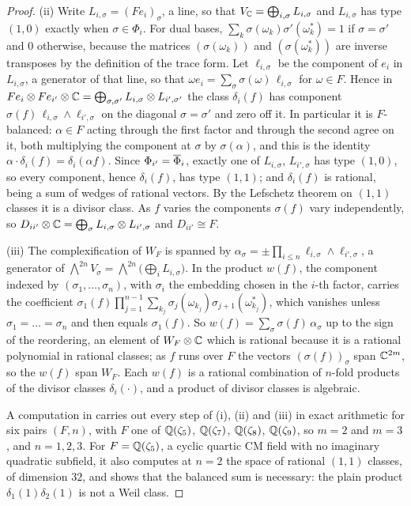 \begin{proof}
(ii) Write $L_{i,\sigma}=(Fe_{i})_{\sigma}$, a line, so that
$V_{\mathbb{C}}=\bigoplus_{i,\sigma}L_{i,\sigma}$ and $L_{i,\sigma}$ has type $(1,0)$
exactly when $\sigma\in\Phi_{i}$. For dual bases,
$\sum_{k}\sigma(\omega_{k})\sigma'(\omega_{k}^{*})=1$ if $\sigma=\sigma'$ and
$0$ otherwise, because the matrices $(\sigma(\omega_{k}))$ and
$(\sigma(\omega_{k}^{*}))$ are inverse transposes by the definition of the
trace form. Let $\ell_{i,\sigma}$ be the component of $e_{i}$ in
$L_{i,\sigma}$, a generator of that line, so that
$\omega e_{i}=\sum_{\sigma}\sigma(\omega)\,\ell_{i,\sigma}$ for $\omega\in F$.
Hence in $Fe_{i}\otimes Fe_{i'}\otimes\mathbb{C}
=\bigoplus_{\sigma,\sigma'}L_{i,\sigma}\otimes L_{i',\sigma'}$ the class
$\delta_{i}(f)$ has component $\sigma(f)\,\ell_{i,\sigma}\wedge\ell_{i',\sigma}$
on the diagonal $\sigma=\sigma'$ and zero off it. In particular it is
$F$-balanced: $\alpha\in F$ acting through the first factor and through the
second agree on it, both multiplying the component at $\sigma$ by
$\sigma(\alpha)$, and this is the identity
$\alpha\cdot\delta_{i}(f)=\delta_{i}(\alpha f)$. Since $\Phi_{i'}=\overline{\Phi}_{i}$,
exactly one of $L_{i,\sigma}$, $L_{i',\sigma}$ has type $(1,0)$, so every
component, hence $\delta_{i}(f)$, has type $(1,1)$; and $\delta_{i}(f)$ is
rational, being a sum of wedges of rational vectors. By the Lefschetz theorem
on $(1,1)$ classes it is a divisor class. As $f$ varies the components
$\sigma(f)$ vary independently, so $D_{ii'}\otimes\mathbb{C}=\bigoplus_{\sigma}
L_{i,\sigma}\otimes L_{i',\sigma}$ and $D_{ii'}\cong F$.

(iii) The complexification of $W_{F}$ is spanned by
$\alpha_{\sigma}=\pm\prod_{i\le n}\ell_{i,\sigma}\wedge\ell_{i',\sigma}$, a
generator of $\bigwedge^{2n}V_{\sigma}=\bigwedge^{2n}\bigl(\bigoplus_{i}L_{i,\sigma}\bigr)$.
In the product $w(f)$, the component indexed by $(\sigma_{1},\dots,\sigma_{n})$,
with $\sigma_{i}$ the embedding chosen in the $i$-th factor, carries the
coefficient
$\sigma_{1}(f)\prod_{j=1}^{n-1}\sum_{k_{j}}\sigma_{j}(\omega_{k_{j}})\sigma_{j+1}(\omega_{k_{j}}^{*})$,
which vanishes unless $\sigma_{1}=\dots=\sigma_{n}$ and then equals
$\sigma_{1}(f)$. So $w(f)=\sum_{\sigma}\sigma(f)\,\alpha_{\sigma}$ up to the
sign of the reordering, an element of $W_{F}\otimes\mathbb{C}$ which is rational
because it is a rational polynomial in rational classes; as $f$ runs over
$F$ the vectors $(\sigma(f))_{\sigma}$ span $\mathbb{C}^{2m}$, so the $w(f)$ span
$W_{F}$. Each $w(f)$ is a rational combination of $n$-fold products of the
divisor classes $\delta_{i}(\cdot)$, and a product of divisor classes is
algebraic.

A computation in \cite{BMB26} carries out every
step of (i), (ii) and (iii) in exact arithmetic for six pairs $(F,n)$, with
$F$ one of $\mathbb{Q}(\zeta_{5})$, $\mathbb{Q}(\zeta_{7})$, $\mathbb{Q}(\zeta_{8})$,
$\mathbb{Q}(\zeta_{9})$, so $m=2$ and $m=3$, and $n=1,2,3$. For
$F=\mathbb{Q}(\zeta_{5})$, a cyclic quartic CM field with no imaginary quadratic
subfield, it also computes at $n=2$ the space of rational $(1,1)$ classes, of
dimension $32$, and shows that the balanced sum is necessary: the plain
product $\delta_{1}(1)\delta_{2}(1)$ is not a Weil class.
\end{proof}

